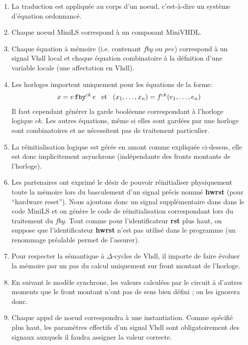 \documentclass[a4paper]{article}
\newcommand{\minils}{{\sc MiniLS}}
\newcommand{\minivhdl}{{\sc MiniVHDL}}
\newcommand{\vhdl}{{\sc Vhdl}}
\newcommand{\mybox}[1]{\mbox{\tt{#1}}}
\newcommand{\Fby}[2]{#1 \, \mybox{fby}^{ck} \, #2}
\newcommand{\App}[2]{#1^{ck}(#2)}
\begin{document}
\begin{enumerate}
\item La traduction est appliqu\'ee au corps d'un noeud, c'est-\`a-dire
un syst\`eme d'\'equation ordonnanc\'e.
\item Chaque noeud \minils{} correspond \`a un composant \minivhdl.
\item Chaque \'equation \`a m\'emoire (i.e. contenant $fby$ ou $pre$) correspond
  \`a un signal \vhdl{} local et
  chaque \'equation combinatoire \`a la d\'efnition d'une variable locale
  (une affectation en \vhdl).
\item Les horloges importent uniquement pour les \'equations de la forme:
\[
\begin{array}{c}
x = \Fby{v}{e}
\end{array}
\mbox{ et }
\begin{array}{c}
(x_1,\dots,x_n) = \App{f}{e_1,\dots,e_n}
\end{array}
\]
Il faut cependant g\'en\'erer la garde bool\'eenne correspondant \`a l'horloge
logique $ck$. Les autres \'equations, m\^eme si elles sont gard\'ees par une
horloge sont combinatoires et ne n\'ecessitent pas de traitement
particulier.
\item La r\'einitialisation logique est g\'er\'ee en amont comme expliqu\'ee ci-dessus,
  elle est donc implicitement asynchrone (ind\'ependante des fronts montants de
  l'horloge).
\item Les partenaires ont exprim\'e le d\'esir de pouvoir r\'einitialiser
  physiquement toute la m\'emoire lors du basculement d'un signal pr\'ecis
  nomm\'e \textbf{hwrst} (pour ``hardware reset''). Nous ajoutons donc
  un signal suppl\'ementaire dans dans le code \minils{} et on g\'en\`ere le
  code de r\'einitialisation correspondant lors du traitement du
  $fby$. Tout comme pour l'identificateur \textbf{rst} plus haut, on
  suppose que l'identificateur \textbf{hwrst} n'est pas utilis\'e dans
  le programme (un renommage pr\'ealable permet de l'assurer).
\item Pour respecter la s\'emantique \`a $\Delta$-cycles de \vhdl{}, il importe de
  faire \'evoluer la m\'emoire par un pas du calcul uniquement sur front montant de
  l'horloge.
\item En suivant le mod\`ele synchrone, les valeurs calcul\'ees par le circuit \`a
  d'autres moments que le front montant n'ont pas de sens bien d\'efini ; on les
  ignorera donc.
\item Chaque appel de noeud correspondra \`a une instantiation. Comme
  sp\'ecifi\'e plus haut, les param\`etres effectifs d'un signal \vhdl{}
  sont obligatoirement des signaux auxquels il faudra assigner la
  valeur correcte.
\end{enumerate}
\end{document}

